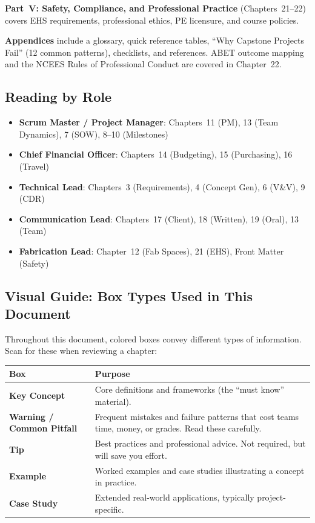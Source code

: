 \textbf{Part~V: Safety, Compliance, and Professional Practice} (Chapters~21--22) covers EHS requirements, professional ethics, PE licensure, and course policies.

\textbf{Appendices} include a glossary, quick reference tables, ``Why Capstone Projects Fail'' (12 common patterns), checklists, and references. ABET outcome mapping and the NCEES Rules of Professional Conduct are covered in Chapter~22.

\subsection*{Reading by Role}
\begin{itemize}[nosep,leftmargin=1.5em]
\item \textbf{Scrum Master / Project Manager}: Chapters~11 (PM), 13 (Team Dynamics), 7 (SOW), 8--10 (Milestones)
\item \textbf{Chief Financial Officer}: Chapters~14 (Budgeting), 15 (Purchasing), 16 (Travel)
\item \textbf{Technical Lead}: Chapters~3 (Requirements), 4 (Concept Gen), 6 (V\&V), 9 (CDR)
\item \textbf{Communication Lead}: Chapters~17 (Client), 18 (Written), 19 (Oral), 13 (Team)
\item \textbf{Fabrication Lead}: Chapter~12 (Fab Spaces), 21 (EHS), Front Matter (Safety)
\end{itemize}

\subsection*{Visual Guide: Box Types Used in This Document}
Throughout this document, colored boxes convey different types of information. Scan for these when reviewing a chapter:

\begin{center}\small
\begin{tabularx}{\textwidth}{lX}
\toprule
\textbf{Box} & \textbf{Purpose} \\
\midrule
\textcolor{MinesBlue}{\textbf{Key Concept}} & Core definitions and frameworks (the ``must know'' material). \\
\textcolor{WarnOrange}{\textbf{Warning / Common Pitfall}} & Frequent mistakes and failure patterns that cost teams time, money, or grades. Read these carefully. \\
\textcolor{AccentTeal}{\textbf{Tip}} & Best practices and professional advice. Not required, but will save you effort. \\
\textcolor{AccentTeal}{\textbf{Example}} & Worked examples and case studies illustrating a concept in practice. \\
\textcolor{GreenShield}{\textbf{Case Study}} & Extended real-world applications, typically project-specific. \\
\bottomrule
\end{tabularx}
\end{center}

